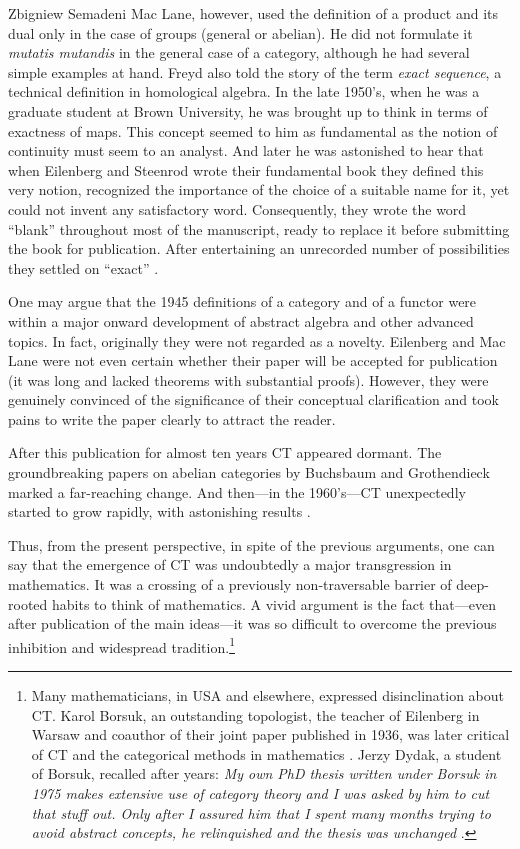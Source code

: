 \begin{artengenv}{Zbigniew Semadeni}
\noindent Mac Lane, however, used the definition of a product and its dual only in 
the case of groups (general or abelian). He did not formulate it \textit{mutatis 
mutandis} in the general case of a category, although he had several simple examples 
at hand. 
Freyd also told the story of the term \textit{exact sequence}, a technical 
definition in homological algebra. In the late 1950's, when he was a graduate student 
at Brown University, he was brought up to think in terms of exactness of maps. 
This concept seemed to him as fundamental as the notion of continuity must seem 
to an analyst. And later he was astonished to hear that when Eilenberg and  
Steenrod wrote their fundamental book \parencite*{Steenrod} they 
defined this very notion, recognized the importance of the choice of a suitable 
name for it, yet could not invent any satisfactory word. Consequently, they 
wrote the word ``blank'' throughout most of the manuscript, ready to replace it 
before submitting the book for publication. After entertaining an unrecorded number 
of possibilities they settled on ``exact'' \parencite[p.157]{Freyd}. 

One may argue that the 1945 definitions of a category and of a functor were within a 
major onward development of abstract algebra and other advanced topics. In fact, 
originally they were not regarded as a novelty. Eilenberg and Mac Lane were not even 
certain whether their paper will be accepted for publication (it was long and lacked 
theorems with substantial proofs). However, they were genuinely convinced of the 
significance of their conceptual clarification and took pains to write the paper 
clearly to attract the reader. 

After this publication for almost ten years CT appeared dormant. The groundbreaking 
papers on abelian categories by Buchsbaum and Gro\-then\-dieck marked 
a far-reaching change. And then---in the 1960's---CT unexpectedly started to 
grow rapidly, with astonishing results \parencite[pp.338--339, 341--361]{Century}.

Thus, from the present perspective, in spite of the previous arguments, one can say 
that the emergence of CT was undoubtedly a major transgression in mathematics. 
It was a crossing of a previously non-traversable barrier of deep-rooted habits to 
think of mathematics. A vivid argument is the fact that---even after publication 
of the main ideas---it was so difficult to overcome the previous inhibition 
and widespread tradition.\footnote{Many mathematicians, in USA and elsewhere, 
expressed disinclination about CT. Karol Borsuk, an outstanding topologist, the 
teacher of Eilenberg in Warsaw and coauthor of their joint paper published in 1936, 
was later critical of CT and the categorical methods in mathematics 
\parencite[p.30]{Jackowski}. Jerzy Dydak, a student of Borsuk, recalled after years: 
\textit{My own PhD thesis written under Borsuk in 1975 makes extensive use 
of category theory and I was asked by him to cut that stuff out. Only after 
I assured him that I spent many months trying to avoid abstract concepts, he 
relinquished and the thesis was unchanged} \parencite[p.92]{Dydak}.} %


\end{artengenv}
